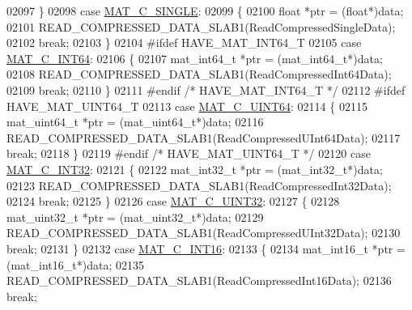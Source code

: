 \begin{DoxyCode}
{{{{{{{{{02097         \}
02098         \textcolor{keywordflow}{case} \hyperlink{group___m_a_t_ggad4d60ae7b709fc81bfd744fb4c857c40a2825631e26a961cbe0f79db50a39cea2}{MAT\_C\_SINGLE}:
02099         \{
02100             \textcolor{keywordtype}{float} *ptr = (\textcolor{keywordtype}{float}*)data;
02101             READ\_COMPRESSED\_DATA\_SLAB1(ReadCompressedSingleData);
02102             \textcolor{keywordflow}{break};
02103         \}
02104 \textcolor{preprocessor}{#ifdef HAVE\_MAT\_INT64\_T}
02105         \textcolor{keywordflow}{case} \hyperlink{group___m_a_t_ggad4d60ae7b709fc81bfd744fb4c857c40a1ea83bcde49b35477494412973f82409}{MAT\_C\_INT64}:
02106         \{
02107             mat\_int64\_t *ptr = (mat\_int64\_t*)data;
02108             READ\_COMPRESSED\_DATA\_SLAB1(ReadCompressedInt64Data);
02109             \textcolor{keywordflow}{break};
02110         \}
02111 \textcolor{preprocessor}{#endif }\textcolor{comment}{/* HAVE\_MAT\_INT64\_T */}\textcolor{preprocessor}{}
02112 \textcolor{preprocessor}{#ifdef HAVE\_MAT\_UINT64\_T}
02113         \textcolor{keywordflow}{case} \hyperlink{group___m_a_t_ggad4d60ae7b709fc81bfd744fb4c857c40a86470e25c3763d9a24623f04326195dd}{MAT\_C\_UINT64}:
02114         \{
02115             mat\_uint64\_t *ptr = (mat\_uint64\_t*)data;
02116             READ\_COMPRESSED\_DATA\_SLAB1(ReadCompressedUInt64Data);
02117             \textcolor{keywordflow}{break};
02118         \}
02119 \textcolor{preprocessor}{#endif }\textcolor{comment}{/* HAVE\_MAT\_UINT64\_T */}\textcolor{preprocessor}{}
02120         \textcolor{keywordflow}{case} \hyperlink{group___m_a_t_ggad4d60ae7b709fc81bfd744fb4c857c40adb44fc39694e3152ae5e69470a2fefe8}{MAT\_C\_INT32}:
02121         \{
02122             mat\_int32\_t *ptr = (mat\_int32\_t*)data;
02123             READ\_COMPRESSED\_DATA\_SLAB1(ReadCompressedInt32Data);
02124             \textcolor{keywordflow}{break};
02125         \}
02126         \textcolor{keywordflow}{case} \hyperlink{group___m_a_t_ggad4d60ae7b709fc81bfd744fb4c857c40a9a17a7edd45b19ef68197db81b27e816}{MAT\_C\_UINT32}:
02127         \{
02128             mat\_uint32\_t *ptr = (mat\_uint32\_t*)data;
02129             READ\_COMPRESSED\_DATA\_SLAB1(ReadCompressedUInt32Data);
02130             \textcolor{keywordflow}{break};
02131         \}
02132         \textcolor{keywordflow}{case} \hyperlink{group___m_a_t_ggad4d60ae7b709fc81bfd744fb4c857c40a40370e9de516c5036a67a5865c071006}{MAT\_C\_INT16}:
02133         \{
02134             mat\_int16\_t *ptr = (mat\_int16\_t*)data;
02135             READ\_COMPRESSED\_DATA\_SLAB1(ReadCompressedInt16Data);
02136             \textcolor{keywordflow}{break};
}}}}}}}}}
\end{DoxyCode}
